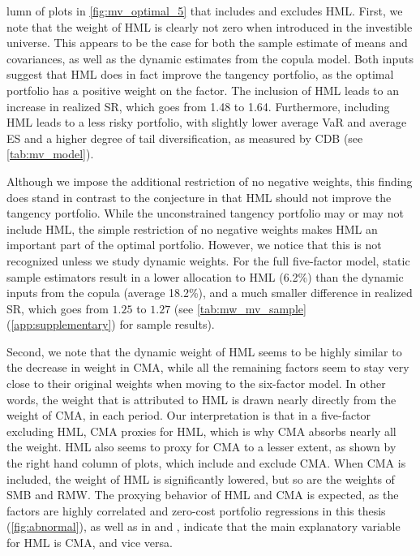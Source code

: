 lumn of plots in \autoref{fig:mv_optimal_5} that includes and excludes HML. First, we note that the weight of HML is clearly not zero when introduced in the investible universe. This appears to be the case for both the sample estimate of means and covariances, as well as the dynamic estimates from the copula model. Both inputs suggest that HML does in fact improve the tangency portfolio, as the optimal portfolio has a positive weight on the factor. The inclusion of HML leads to an increase in realized SR, which goes from 1.48 to 1.64. Furthermore, including HML leads to a less risky portfolio, with slightly lower average VaR and average ES and a higher degree of tail diversification, as measured by CDB (see \autoref{tab:mv_model}).

Although we impose the additional restriction of no negative weights, this finding does stand in contrast to the conjecture in \textcite{FF2015} that HML should not improve the tangency portfolio. While the unconstrained tangency portfolio may or may not include HML, the simple restriction of no negative weights makes HML an important part of the optimal portfolio. However, we notice that this is not recognized unless we study dynamic weights. For the full five-factor model, static sample estimators result in a lower allocation to HML (6.2\%) than the dynamic inputs from the copula (average 18.2\%), and a much smaller difference in realized SR, which goes from $1.25$ to $1.27$ (see \autoref{tab:mw_mv_sample} (\autoref{app:supplementary}) for sample results).

Second, we note that the dynamic weight of HML seems to be highly similar to the decrease in weight in CMA, while all the remaining factors seem to stay very close to their original weights when moving to the six-factor model. In other words, the weight that is attributed to HML is drawn nearly directly from the weight of CMA, in each period. Our interpretation is that in a five-factor excluding HML, CMA proxies for HML, which is why CMA absorbs nearly all the weight. HML also seems to proxy for CMA to a lesser extent, as shown by the right hand column of plots, which include and exclude CMA. When CMA is included, the weight of HML is significantly lowered, but so are the weights of SMB and RMW. The proxying behavior of HML and CMA is expected, as the factors are highly correlated and zero-cost portfolio regressions in this thesis (\autoref{fig:abnormal}), as well as in \textcite{FF2015} and \textcite{Asness2015}, indicate that the main explanatory variable for HML is CMA, and vice versa.

